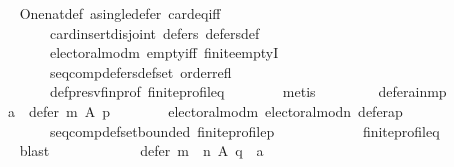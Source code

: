 \begin{isabellebody}
\ \ \ \ \ \ \isamarkupfalse%
\ One{\isacharunderscore}{\kern0pt}nat{\isacharunderscore}{\kern0pt}def\ a{\isacharunderscore}{\kern0pt}single{\isacharunderscore}{\kern0pt}defer\ card{\isacharunderscore}{\kern0pt}eq{\isacharunderscore}{\kern0pt}{}{\isacharunderscore}{\kern0pt}iff\isanewline
\ \ \ \ \ \ \ \ \ \ \ \ card{\isacharunderscore}{\kern0pt}insert{\isacharunderscore}{\kern0pt}disjoint\ defers{\isacharunderscore}{\kern0pt}{}\ defers{\isacharunderscore}{\kern0pt}def\isanewline
\ \ \ \ \ \ \ \ \ \ \ \ electoral{\isacharunderscore}{\kern0pt}mod{\isacharunderscore}{\kern0pt}m\ empty{\isacharunderscore}{\kern0pt}iff\ finite{\isachardot}{\kern0pt}emptyI\isanewline
\ \ \ \ \ \ \ \ \ \ \ \ seq{\isacharunderscore}{\kern0pt}comp{\isacharunderscore}{\kern0pt}defers{\isacharunderscore}{\kern0pt}def{\isacharunderscore}{\kern0pt}set\ order{\isacharunderscore}{\kern0pt}refl\isanewline
\ \ \ \ \ \ \ \ \ \ \ \ def{\isacharunderscore}{\kern0pt}presv{\isacharunderscore}{\kern0pt}fin{\isacharunderscore}{\kern0pt}prof\ finite{\isacharunderscore}{\kern0pt}profile{\isacharunderscore}{\kern0pt}q\isanewline
\ \ \ \ \ \ \isamarkupfalse%
\ metis\ \isanewline
\ \ \ \ \isamarkupfalse%
\ \isamarkupfalse%
\ defer{\isacharunderscore}{\kern0pt}a{\isacharunderscore}{\kern0pt}in{\isacharunderscore}{\kern0pt}m{\isacharunderscore}{\kern0pt}p{\isacharcolon}{\kern0pt}\isanewline
\ \ \ \ \ \ {\isachardoublequoteopen}a\ {\isasymin}\ defer\ m\ A\ p{\isachardoublequoteclose}\isanewline
\ \ \ \ \ \ \isamarkupfalse%
\ electoral{\isacharunderscore}{\kern0pt}mod{\isacharunderscore}{\kern0pt}m\ electoral{\isacharunderscore}{\kern0pt}mod{\isacharunderscore}{\kern0pt}n\ defer{\isacharunderscore}{\kern0pt}a{\isacharunderscore}{\kern0pt}p\isanewline
\ \ \ \ \ \ \ \ \ \ \ \ seq{\isacharunderscore}{\kern0pt}comp{\isacharunderscore}{\kern0pt}def{\isacharunderscore}{\kern0pt}set{\isacharunderscore}{\kern0pt}bounded\ finite{\isacharunderscore}{\kern0pt}profile{\isacharunderscore}{\kern0pt}p\isanewline
\ \ \ \ \ \ \ \ \ \ \ \ finite{\isacharunderscore}{\kern0pt}profile{\isacharunderscore}{\kern0pt}q\isanewline
\ \ \ \ \ \ \isamarkupfalse%
\ blast\isanewline
\ \ \ \ \isamarkupfalse%
\ \isamarkupfalse%
\isanewline
\ \ \ \ \ \ {\isachardoublequoteopen}defer\ {\isacharparenleft}{\kern0pt}m\ {\isasymtriangleright}\ n{\isacharparenright}{\kern0pt}\ A\ q\ {\isacharequal}{\kern0pt}\ {\isacharbraceleft}{\kern0pt}a{\isacharbraceright}{\kern0pt}{\isachardoublequoteclose}\ \isanewline

\end{isabellebody}
